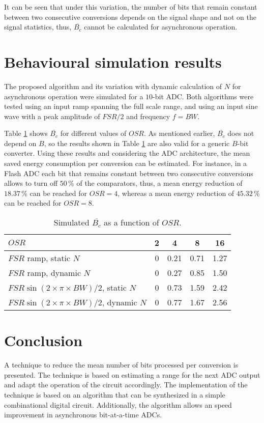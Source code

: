 \documentclass[twocolumn]{el-author}
\begin{document}
It can be seen that under this variation, the number of bits that remain constant between two consecutive conversions depends on the signal shape and not on the signal statistics, thus, $\overline{\mathit{B}_c}$ cannot be calculated for asynchronous operation.

\section{Behavioural simulation results}
The proposed algorithm and its variation with dynamic calculation of $N$ for asynchronous operation were simulated for a \mbox{$10$-bit} ADC. Both algorithms were tested using an input ramp spanning the full scale range, and using an input sine wave with a peak amplitude of $\mathit{FSR/2}$ and frequency $f=\mathit{BW}$. 

Table \ref{table:results} shows $\overline{\mathit{B}_c}$ for different values of $\mathit{OSR}$. As mentioned earlier, $\overline{\mathit{B}_c}$ does not depend on $B$, so the results shown in Table \ref{table:results} are also valid for a generic $B$-bit converter. Using these results and considering the ADC architecture, the mean saved energy consumption per conversion can be estimated. For instance, in a Flash ADC each bit that remains constant between two consecutive conversions allows to turn off  $50\,\%$ of the comparators, thus, a mean energy reduction of $18.37\,\%$ can be reached for $\mathit{OSR}=4$, whereas a mean energy reduction of $45.32\,\%$ can be reached for $\mathit{OSR}=8$. 
\begin{table}[!h]
\centering
\begin{tabular}{|l|c|c|c|c|}\hline
 $\mathit{OSR}$ & 2 & 4 & 8 & 16 \\\hline 
$\mathit{FSR}$ ramp, static $N$ & 0 & 0.21 & 0.71 &  1.27 \\ 
$\mathit{FSR}$ ramp, dynamic $N$ & 0 &  0.27 & 0.85 & 1.50 \\ 
$\mathit{FSR}\sin(2 \times \pi \times \mathit{BW})/2$, static $N$ & 0 & 0.73 & 1.59 & 2.42 \\ 
$\mathit{FSR}\sin(2 \times \pi \times \mathit{BW})/2$, dynamic $N$ & 0 &  0.77 & 1.67 & 2.56 \\\hline  
\end{tabular}
\vspace{0.1cm}
\caption{Simulated $\overline{\mathit{B}_c}$ as a function of $\mathit{OSR}$.}
\label{table:results}
\end{table}


\section{Conclusion}
A technique to reduce the mean number of bits processed per conversion is presented. The technique is based on estimating a range for the next ADC output and adapt the operation of the circuit accordingly.
The implementation of the technique is based on an algorithm that can be synthesized in a simple combinational digital circuit.
Additionally, the algorithm allows an speed improvement in asynchronous \mbox{bit-at-a-time} ADCs.
\end{document}
